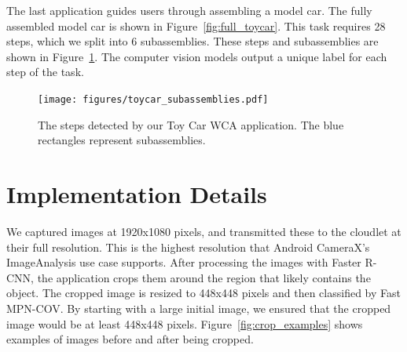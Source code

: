 The last application guides users through assembling a model car.
The fully assembled model car is shown in Figure~\ref{fig:full_toycar}.
This task requires 28 steps, which we split into 6 subassemblies.
These steps and subassemblies are shown in Figure~\ref{fig:toy_car}.
The computer vision models output a unique label for each step of the task.

\begin{figure}
  \texttt{[image: figures/toycar\_subassemblies.pdf]}
  \caption[The steps detected by our Toy Car WCA application]{
    The steps detected by our Toy Car WCA application.
    The blue rectangles represent subassemblies.
  }\label{fig:toy_car}
\end{figure}

\section{Implementation Details}\label{sec:implementation_details}

We captured images at 1920x1080 pixels, and transmitted these to the cloudlet at
their full resolution.
This is the highest resolution that Android CameraX's ImageAnalysis use case
supports.
After processing the images with Faster R-CNN, the application crops them around
the region that likely contains the object.
The cropped image is resized to 448x448 pixels and then classified by Fast
MPN-COV.
By starting with a large initial image, we ensured that the cropped image would
be at least 448x448 pixels.
Figure~\ref{fig:crop_examples} shows examples of images before and after being
cropped.

